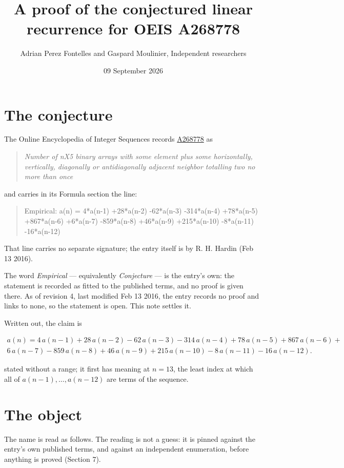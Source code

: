 \documentclass[11pt]{article}
\title{A proof of the conjectured linear recurrence for OEIS A268778}
\author{Adrian Perez Fontelles and Gaspard Moulinier, Independent researchers}
\date{09 September 2026}
\theoremstyle{definition}
\begin{document}
\maketitle
\section{The conjecture}

The Online Encyclopedia of Integer Sequences records \href{https://oeis.org/A268778}{A268778} as

\begin{quote}\itshape Number of nX5 binary arrays with some element plus some horizontally, vertically, diagonally or antidiagonally adjacent neighbor totalling two no more than once\end{quote}

and carries in its Formula section the line:

\begin{quote}\ttfamily Empirical: a(n) = 4*a(n-1) +28*a(n-2) -62*a(n-3) -314*a(n-4) +78*a(n-5) +867*a(n-6) +6*a(n-7) -859*a(n-8) +46*a(n-9) +215*a(n-10) -8*a(n-11) -16*a(n-12)\end{quote}

That line carries no separate signature; the entry itself is by R. H. Hardin (Feb 13 2016).

The word {\itshape Empirical} --- equivalently {\itshape Conjecture} --- is the entry's own: the statement is recorded as fitted to the published terms, and no proof is given there. As of revision 4, last modified Feb 13 2016, the entry records no proof and links to none, so the statement is open. This note settles it.

Written out, the claim is

\begin{multline*} a(n) = 4\,a(n-1) + 28\,a(n-2) - 62\,a(n-3) - 314\,a(n-4) + 78\,a(n-5) + 867\,a(n-6) + \\ 6\,a(n-7) - 859\,a(n-8) + 46\,a(n-9) + 215\,a(n-10) - 8\,a(n-11) - 16\,a(n-12). \end{multline*}

stated without a range; it first has meaning at $n = 13$, the least index at which all of $a(n-1),\dots,a(n-12)$ are terms of the sequence.

\section{The object}

The name is read as follows. The reading is not a guess: it is pinned against the entry's own published terms, and against an independent enumeration, before anything is proved (Section 7).
\end{document}
